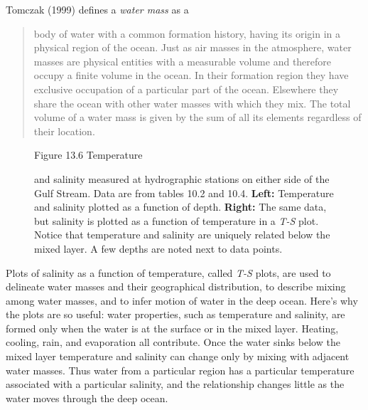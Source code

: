 Tomczak (1999) defines a \textit{water mass} as a
\begin{quote} \small
body of water with a common formation history, having its origin in a physical
region of the ocean. Just as air masses in the atmosphere, water masses are
physical entities with a measurable volume and therefore occupy a finite
volume in the ocean. In their formation region they have exclusive occupation
of a particular part of the ocean. Elsewhere they share the ocean with other
water masses with which they mix. The total volume of a water mass is given by
the sum of all its elements regardless of their location.
\end{quote}

\begin{figure}[b!]
\vspace{-2ex}
\footnotesize
Figure 13.6 Temperature \rule{0mm}{3ex}and salinity measured at
hydrographic stations on either side of the
Gulf Stream. Data are from tables 10.2 and 10.4.
\textbf{Left:} Temperature and salinity plotted as a function of depth.
\textbf{Right:} The same data, but salinity is plotted as a function of
temperature in a \textit{T-S} plot. Notice that temperature and salinity are
uniquely related below the mixed layer. A few depths are noted next
to data points.
\label{fig:GulfStreamTSDPlot}
\end{figure}

Plots of salinity as a function of temperature, called \textit{T-S} plots, are
used to delineate water masses and their geographical distribution, to describe
mixing among water masses, and to infer motion of water in
the deep ocean. Here's why the plots are so useful: water properties, such as temperature
and salinity, are formed only when the water is at the surface or in the mixed
layer. Heating, cooling, rain, and evaporation
all contribute. Once the water sinks below the mixed layer temperature and
salinity can change only by mixing with adjacent water
masses. Thus water from a particular region has a particular temperature associated with a
particular salinity, and the relationship changes little as the water moves through the deep
ocean.

